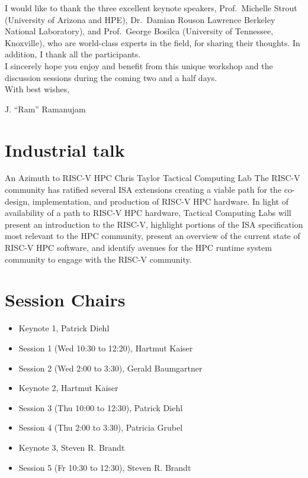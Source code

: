 \documentclass[12pt,letterpaper]{book}
\newenvironment{conf-abstract}[4][]{
 \needspace{10\baselineskip}
 \begin{center}
 { \renewcommand\textsuperscript[1]{}
 \phantomsection\addcontentsline{toc}{section}
 {\texorpdfstring{#2 (\emph{#3})}{#2 (#3)}}
 }
 {{\large\bfseries #2}\marginnote{#1}\par}
 \medskip
 {#3\par}
 \smallskip
 {\small #4\par}
 \end{center}
}{%
 \bigskip
 \hrule
 \bigskip
}
\begin{document}
\noindent I would like to thank the three excellent keynote speakers, Prof.\ Michelle Strout (University of Arizona and HPE), Dr.\ Damian Rouson Lawrence Berkeley National Laboratory), and Prof.\ George Bosilca (University of Tennessee, Knoxville), who are world-class experts in the field, for sharing their thoughts. In addition, I thank all the participants.\\

\noindent I sincerely hope you enjoy and benefit from this unique workshop and the discussion sessions during the coming two and a half days.\\

\noindent With best wishes,

J. “Ram” Ramanujam



%

\newpage



\tableofcontents

\mainmatter

\chapter{Industrial talk}

\begin{conf-abstract}[27$^{th}$]
{An Azimuth to RISC-V HPC}
{Chris Taylor}
{Tactical Computing Lab}
The RISC-V community has ratified several ISA extensions creating a viable path for the co-design, implementation, and production of RISC-V HPC hardware. In light of availability of a path to RISC-V HPC hardware, Tactical Computing Labs will present an introduction to the RISC-V, highlight portions of the ISA specification most relevant to the HPC community, present an overview of the current state of RISC-V HPC software,  and identify avenues for the HPC runtime system community to engage with the RISC-V community.
\end{conf-abstract}

\chapter{Session Chairs}

\begin{itemize}
\item Keynote 1, Patrick Diehl
\item Session 1 (Wed 10:30 to 12:20), Hartmut Kaiser 
\item Session 2 (Wed 2:00 to 3:30), Gerald Baumgartner
\item Keynote 2, Hartmut Kaiser
\item Session 3 (Thu 10:00 to 12:30), Patrick Diehl
\item Session 4 (Thu 2:00 to 3:30), Patricia Grubel
\item Keynote 3, Steven R. Brandt
\item Session 5 (Fr 10:30 to 12:30), Steven R. Brandt 
\end{itemize}
\end{document}
